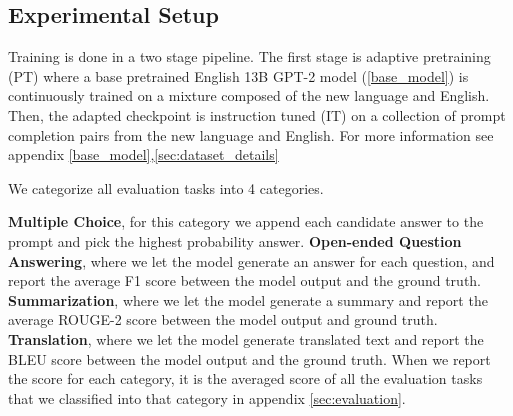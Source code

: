 \subsection{Experimental Setup}
Training is done in a two stage pipeline. The first stage is adaptive pretraining (PT) where a base pretrained English 13B GPT-2 model (\ref{base_model}) is continuously trained on a mixture composed of the new language and English. Then, the adapted checkpoint is instruction tuned (IT) on a collection of prompt completion pairs from the new language and English. For more information see appendix \ref{base_model},\ref{sec:dataset_details}

We categorize all evaluation tasks into 4 categories. {\textbf{Multiple Choice}, for this category we append each candidate answer to the prompt and pick the highest probability answer. \textbf{Open-ended Question Answering}, where we let the model generate an answer for each question, and report the average F1 score between the model output and the ground truth. \textbf{Summarization}, where we let the model generate a summary and report the average ROUGE-2 score between the model output and ground truth.
\textbf{Translation}, where we let the model generate translated text and report the BLEU score between the model output and the ground truth. When we report the score for each category, it is the averaged score of all the evaluation tasks that we classified into that category in appendix \ref{sec:evaluation}. 





}
